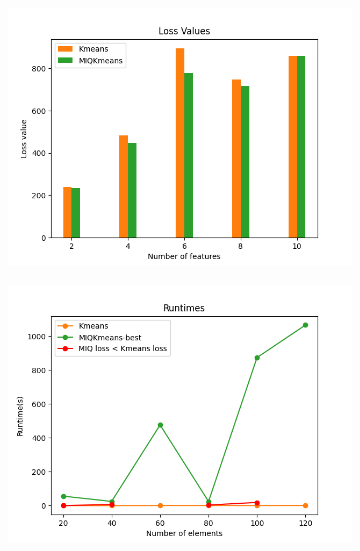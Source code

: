 \documentclass{article}
\begin{document}
\begin{figure}[h]
     \begin{subfigure}{0.32\linewidth}
         \includegraphics[width=\linewidth]{../results/plots/loss_features_sint2}
     \end{subfigure}
     \begin{subfigure}{0.32\linewidth}
         \includegraphics[width=\linewidth]{../results/plots/runtime_size_sint2}
     \end{subfigure}%
     \begin{subfigure}{0.32\linewidth}

\end{subfigure}
\end{figure}
\end{document}
